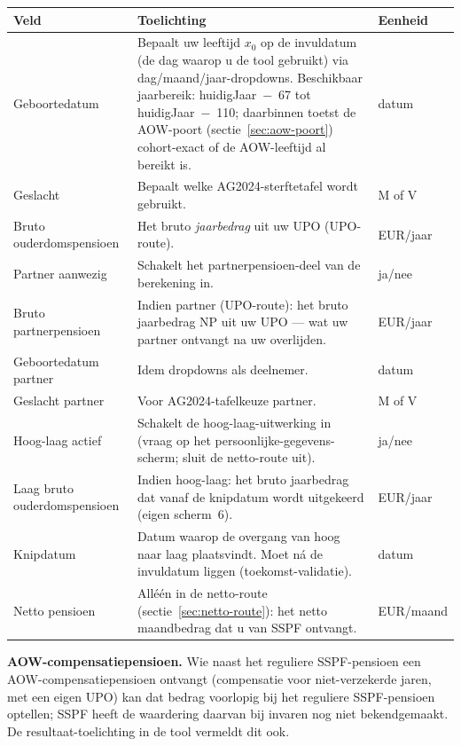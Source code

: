 \documentclass[11pt,a4paper]{article}
\begin{document}
\begin{longtable}{@{}>{\raggedright\arraybackslash}p{}
                    >{\raggedright\arraybackslash}p{}
                    >{\raggedright\arraybackslash}p{}@{}}
\toprule
\textbf{Veld} & \textbf{Toelichting} & \textbf{Eenheid} \\
\midrule
\endhead
Geboortedatum & Bepaalt uw leeftijd $x_0$ op de invuldatum (de dag waarop u de tool gebruikt) via dag/maand/jaar-dropdowns. Beschikbaar jaarbereik: huidigJaar~$-$~67 tot huidigJaar~$-$~110; daarbinnen toetst de AOW-poort (sectie~\ref{sec:aow-poort}) cohort-exact of de AOW-leeftijd al bereikt is. & datum \\
Geslacht & Bepaalt welke AG2024-sterftetafel wordt gebruikt. & M of V \\
Bruto ouderdomspensioen & Het bruto \emph{jaarbedrag} uit uw UPO (UPO-route). & EUR/jaar \\
Partner aanwezig & Schakelt het partnerpensioen-deel van de berekening in. & ja/nee \\
Bruto partnerpensioen & Indien partner (UPO-route): het bruto jaarbedrag NP uit uw UPO --- wat uw partner ontvangt na uw overlijden. & EUR/jaar \\
Geboortedatum partner & Idem dropdowns als deelnemer. & datum \\
Geslacht partner & Voor AG2024-tafelkeuze partner. & M of V \\
Hoog-laag actief & Schakelt de hoog-laag-uitwerking in (vraag op het persoonlijke-gegevens-scherm; sluit de netto-route uit). & ja/nee \\
Laag bruto ouderdomspensioen & Indien hoog-laag: het bruto jaarbedrag dat vanaf de knipdatum wordt uitgekeerd (eigen scherm~6). & EUR/jaar \\
Knipdatum & Datum waarop de overgang van hoog naar laag plaatsvindt. Moet ná de invuldatum liggen (toekomst-validatie). & datum \\
Netto pensioen & Alléén in de netto-route (sectie~\ref{sec:netto-route}): het netto maandbedrag dat u van SSPF ontvangt. & EUR/maand \\
\bottomrule
\end{longtable}

\textbf{AOW-compen\-satie\-pensioen.} Wie naast het reguliere SSPF-pensioen een AOW-compen\-satie\-pensioen ontvangt (compensatie voor niet-verzekerde jaren, met een eigen UPO) kan dat bedrag voorlopig bij het reguliere SSPF-pensioen optellen; SSPF heeft de waardering daarvan bij invaren nog niet bekendgemaakt. De resultaat-toelichting in de tool vermeldt dit ook.
\end{document}
